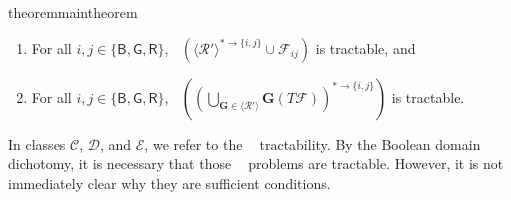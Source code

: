 \documentclass[11pt]{article}
\DeclareMathOperator{\holbs}{Holant^*_2}
\newcommand{\db}{\mathsf{B}}
\newcommand{\dg}{\mathsf{G}}
\newcommand{\dr}{\mathsf{R}}
\newcommand{\octgroup}{O_h}
\newcommand{\domres}[1]{
  ^{*\to\{#1\}}
}
\newcommand{\tractBG}{$\mathscr{C}$\xspace}
\newcommand{\tractBGR}{$\mathscr{D}$\xspace}
\newcommand{\tractBGGRBR}{$\mathscr{E}$\xspace}
\begin{document}
\begin{restatable}{theorem}{maintheorem}
\begin{enumerate}
\begin{enumerate}
        and $\langle \mathcal{R}' \rangle \subseteq \octgroup$, where
        $\langle \mathcal{R}' \rangle$ is the monoid generated by $\mathcal{R}'
        =\mathbb{R} \mathcal{R} \cap \octgroup$, and
\item 
        For all $i, j \in \{\db, \dg, \dr\}$, $\holbs( \langle \mathcal{R}' \rangle\domres{i, j} \cup \mathcal{F}_{ij})$ is tractable, and
\item 
        For all $i, j \in \{ \db, \dg, \dr\}$, 
$\holbs( (\bigcup_{\mathbf{G} \in \langle \mathcal{R}' \rangle} \mathbf{G} (T \mathcal{F})) \domres{i, j})$ is tractable.
      \end{enumerate}
  \end{enumerate}
\end{restatable}



In classes \tractBG, \tractBGR, and \tractBGGRBR, we refer to the $\holbs$ tractability.
By the Boolean domain dichotomy, it is necessary that those $\holbs$ problems are tractable.
However, it is not immediately clear why they are sufficient conditions.
\end{document}
